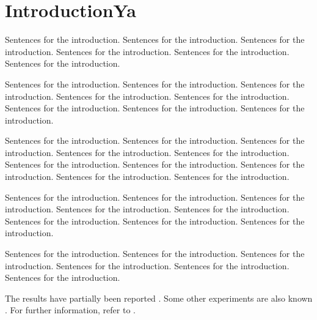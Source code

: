 \chapter{IntroductionYa}

Sentences for the introduction.  Sentences for the introduction.
Sentences for the introduction.  Sentences for the introduction.
Sentences for the introduction.  Sentences for the introduction.

Sentences for the introduction.  Sentences for the introduction.
Sentences for the introduction.  Sentences for the introduction.
Sentences for the introduction.  Sentences for the introduction.
Sentences for the introduction.  Sentences for the introduction.

Sentences for the introduction.  Sentences for the introduction.
Sentences for the introduction.  Sentences for the introduction.
Sentences for the introduction.  Sentences for the introduction.
Sentences for the introduction.  Sentences for the introduction.
Sentences for the introduction.  Sentences for the introduction.

Sentences for the introduction.  Sentences for the introduction.
Sentences for the introduction.  Sentences for the introduction.
Sentences for the introduction.  Sentences for the introduction.
Sentences for the introduction.  Sentences for the introduction.

Sentences for the introduction.  Sentences for the introduction.
Sentences for the introduction.  Sentences for the introduction.
Sentences for the introduction.  Sentences for the introduction.

The results have partially been reported \cite{92795}.
Some other experiments are also known \cite{Knuth86, BollenHHJ07}.
For further information, refer to \cite{CI08e}.


